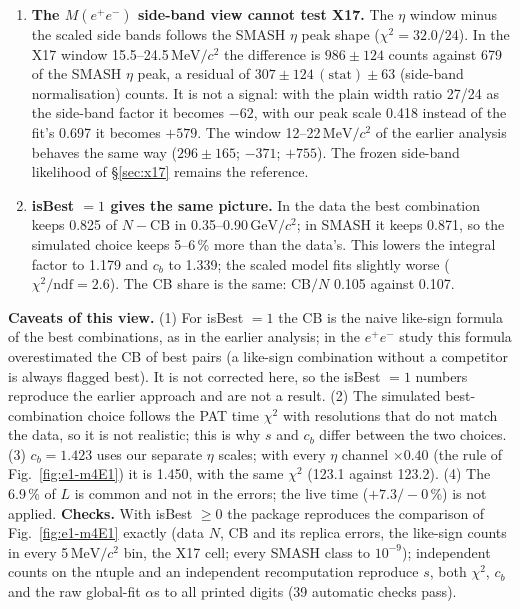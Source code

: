 \documentclass[11pt,a4paper]{article}
\newcommand{\ee}{\ensuremath{e^{+}e^{-}}\xspace}
\newcommand{\Mee}{\ensuremath{M(e^{+}e^{-})}\xspace}
\newcommand{\GeVcc}{\ensuremath{\mathrm{GeV}/c^{2}}\xspace}
\newcommand{\MeVcc}{\ensuremath{\mathrm{MeV}/c^{2}}\xspace}
\begin{document}
\begin{enumerate}
      its kinematic edge, which does not need the background level) and $0.46\pm0.06$ (common $\eta$ scale of the flexible description,
      \S\ref{sec:flex}). The global fit gives a larger peak and a larger bump. The two approaches agree in one sense only: SMASH's $\eta$ must come
      down by a factor of about 1.4--2.4, and its non-$\eta$ background must go up by 25--45\,\% (rest $\times$1.24--1.33 in the global fit,
      $c_b=1.34$--1.45 with our scales; they differ because the rest also holds the other $\eta$ decays and $c_b$ is set in 0.575--0.70\,\GeVcc
      only). The earlier style cannot replace the edge and peak measurements; its $\eta$ numbers move with choices that our methods do not have.
\item \textbf{The \Mee side-band view cannot test X17.} The $\eta$ window minus the scaled side bands follows the SMASH $\eta$ peak shape
      ($\chi^2=32.0/24$). In the X17 window 15.5--24.5\,\MeVcc the difference is $986\pm124$ counts against 679 of the SMASH $\eta$ peak, a residual
      of $307\pm124\,(\mathrm{stat})\pm63$ (side-band normalisation) counts. It is not a signal: with the plain width ratio 27/24 as the side-band
      factor it becomes $-62$, with our peak scale 0.418 instead of the fit's 0.697 it becomes $+579$. The window 12--22\,\MeVcc of the earlier
      analysis behaves the same way ($296\pm165$; $-371$; $+755$). The frozen side-band likelihood of \S\ref{sec:x17} remains the reference.
\item \textbf{isBest $=1$ gives the same picture.} In the data the best combination keeps 0.825 of $N-\mathrm{CB}$ in 0.35--0.90\,\GeVcc; in
      SMASH it keeps 0.871, so the simulated choice keeps 5--6\,\% more than the data's. This lowers the integral factor to 1.179 and $c_b$ to
      1.339; the scaled model fits slightly worse ($\chi^2/\mathrm{ndf}=2.6$). The CB share is the same: CB$/N$ 0.105 against 0.107.
\end{enumerate}

\textbf{Caveats of this view.} (1) For isBest $=1$ the CB is the naive like-sign formula of the best combinations, as in the earlier analysis; in
the \ee study this formula overestimated the CB of best pairs (a like-sign combination without a competitor is always flagged best). It is not
corrected here, so the isBest $=1$ numbers reproduce the earlier approach and are not a result. (2) The simulated best-combination choice follows the
PAT time $\chi^2$ with resolutions that do not match the data, so it is not realistic; this is why $s$ and $c_b$ differ between the two choices.
(3) $c_b=1.423$ uses our separate $\eta$ scales; with every $\eta$ channel $\times0.40$ (the rule of Fig.~\ref{fig:e1-m4E1}) it is 1.450, with the
same $\chi^2$ (123.1 against 123.2). (4) The 6.9\,\% of $L$ is common and not in the errors; the live time ($+7.3/-0$\,\%) is not applied.
\textbf{Checks.} With isBest $\ge0$ the package reproduces the comparison of Fig.~\ref{fig:e1-m4E1} exactly (data $N$, CB and its replica errors,
the like-sign counts in every 5\,\MeVcc bin, the X17 cell; every SMASH class to $10^{-9}$); independent counts on the ntuple and an independent
recomputation reproduce $s$, both $\chi^2$, $c_b$ and the raw global-fit $\alpha$s to all printed digits (39 automatic checks pass).
\end{document}

